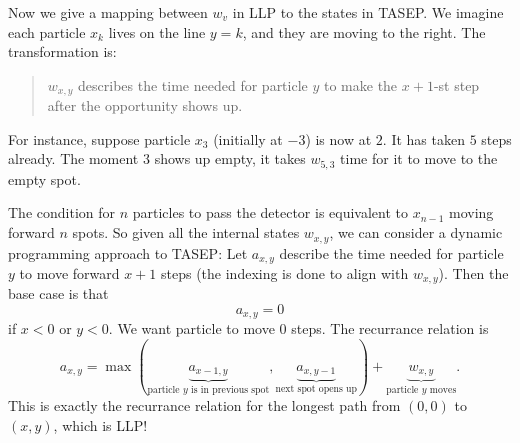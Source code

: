 Now we give a mapping between $w_v$ in LLP to the states in TASEP. We imagine each particle $x_k$ lives on the line $y=k$, and they are moving to the right. The transformation is: \begin{quote}
    $w_{x,y}$ describes the time needed for particle $y$ to make the $x+1$-st step after the opportunity shows up.
\end{quote}
For instance, suppose particle $x_3$ (initially at $-3$) is now at $2$. It has taken $5$ steps already. The moment $3$ shows up empty, it takes $w_{5,3}$ time for it to move to the empty spot.


The condition for $n$ particles to pass the detector is equivalent to $x_{n-1}$ moving forward $n$ spots. So given all the internal states $w_{x,y}$, we can consider a dynamic programming approach to TASEP: Let $a_{x,y}$ describe the time needed for particle $y$ to move forward $x+1$ steps (the indexing is done to align with $w_{x,y}$). Then the base case is that \[
a_{x,y}=0
\]
if $x<0$ or $y<0$. We want particle to move $0$ steps.
The recurrance relation is
\[
a_{x,y} = \max(\underbrace{a_{x-1,y}}_{\text{particle $y$ is in previous spot}}, \underbrace{a_{x,y-1}}_{\text{next spot opens up}})+\underbrace{w_{x,y}}_{\text{particle $y$ moves}} .
\] 
This is exactly the recurrance relation for the longest path from $(0,0)$ to $(x,y)$, which is LLP!

